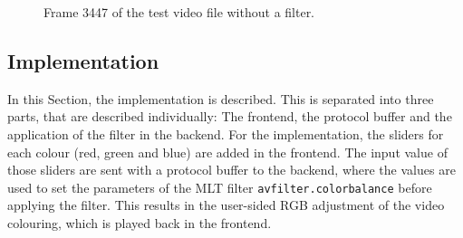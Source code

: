 \documentclass[../MasterThesis.tex]{subfiles}
\begin{document}
\begin{figure}[H]
	\begin{center}
		\caption[Frame 3447 of the test video file without a filter.]{Frame 3447 of the test video file without a filter.}
		\label{figure:septo_nofilter}
	\end{center}
\end{figure}












\subsection{Implementation} \label{subsection:implementation}

In this Section, the implementation is described. This is separated into three parts, that are described individually: The frontend, the protocol buffer and the application of the filter in the backend. For the implementation, the sliders for each colour (red, green and blue) are added in the frontend. The input value of those sliders are sent with a protocol buffer to the backend, where the values are used to set the parameters of the MLT filter \texttt{avfilter.colorbalance} before applying the filter. This results in the user-sided RGB adjustment of the video colouring, which is played back in the frontend.

\end{document}
